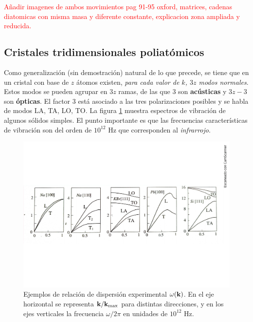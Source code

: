 \begin{Anotacion}
	\textcolor{red}{Añadir imagenes de ambos movimientos pag 91-95 oxford, matrices, cadenas diatomicas con misma masa y diferente constante, explicacion zona ampliada y reducida.}
\end{Anotacion}	

\subsection{Cristales tridimensionales poliatómicos}

Como generalización (sin demostración) natural de lo que precede, se tiene que en un cristal con base de $z$ átomos existen, \textit{para cada valor de $k$, $3z$ modos normales}. Estos modos se pueden agrupar en $3z$ ramas, de las que $3$ son \textbf{acústicas} y $3z-3$ son \textbf{ópticas}. El factor 3 está asociado a las tres polarizaciones posibles y se habla de modos LA, TA, LO, TO. La figura \ref{Fig:04-07} muestra espectros de vibración de algunos sólidos simples. El punto importante es que las frecuencias características de vibración son del orden de $10^{12}$ Hz que corresponden al \textit{infrarrojo}.

\begin{figure}[h!] \centering
    \includegraphics[scale=0.42]{Cuerpo/Ch_04/Fotos libro 7.pdf}
    \caption{Ejemplos de relación de dispersión experimental $\omega (\mathbf{k})$. En el eje horizontal se representa $\mathbf{k}/\mathbf{k}_{\max}$ para distintas direcciones, y en los ejes verticales la frecuencia $\omega/2\pi$ en unidades de $10^{12}$ Hz.}
    \label{Fig:04-07}
\end{figure}    

